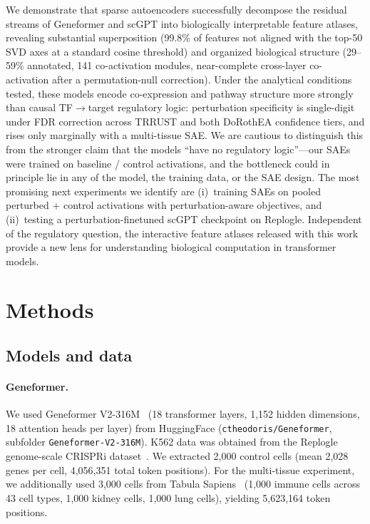 \documentclass[onecolumn]{article}
\begin{document}
We demonstrate that sparse autoencoders successfully decompose the residual streams of Geneformer and scGPT into biologically interpretable feature atlases, revealing substantial superposition (99.8\% of features not aligned with the top-50 SVD axes at a standard cosine threshold) and organized biological structure (29--59\% annotated, 141 co-activation modules, near-complete cross-layer co-activation after a permutation-null correction). Under the analytical conditions tested, these models encode co-expression and pathway structure more strongly than causal TF$\to$target regulatory logic: perturbation specificity is single-digit under FDR correction across TRRUST and both DoRothEA confidence tiers, and rises only marginally with a multi-tissue SAE. We are cautious to distinguish this from the stronger claim that the models ``have no regulatory logic''---our SAEs were trained on baseline / control activations, and the bottleneck could in principle lie in any of the model, the training data, or the SAE design. The most promising next experiments we identify are (i)~training SAEs on pooled perturbed + control activations with perturbation-aware objectives, and (ii)~testing a perturbation-finetuned scGPT checkpoint on Replogle. Independent of the regulatory question, the interactive feature atlases released with this work provide a new lens for understanding biological computation in transformer models.


\section{Methods}

\subsection{Models and data}

\paragraph{Geneformer.} We used Geneformer V2-316M~\cite{theodoris2023transfer} (18 transformer layers, 1,152 hidden dimensions, 18 attention heads per layer) from HuggingFace (\texttt{ctheodoris/\allowbreak Geneformer}, subfolder \texttt{Geneformer-V2-316M}). K562 data was obtained from the Replogle genome-scale CRISPRi dataset~\cite{replogle2022mapping}. We extracted 2,000 control cells (mean 2,028 genes per cell, 4,056,351 total token positions). For the multi-tissue experiment, we additionally used 3,000 cells from Tabula Sapiens~\cite{tabula2022tabula} (1,000 immune cells across 43 cell types, 1,000 kidney cells, 1,000 lung cells), yielding 5,623,164 token positions.
\end{document}
